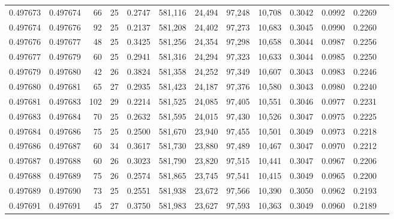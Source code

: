\begin{tabular}{rrrrrrrrrrrrr}
0.497673 & 0.497674 &  66 &  25 &                                     0.2747 & 581,116 &  24,494 &  97,248 &  10,708 & 0.3042 & 0.0992 & 0.2269 \\
0.497674 & 0.497676 &  92 &  25 &                                     0.2137 & 581,208 &  24,402 &  97,273 &  10,683 & 0.3045 & 0.0990 & 0.2260 \\
0.497676 & 0.497677 &  48 &  25 &                                     0.3425 & 581,256 &  24,354 &  97,298 &  10,658 & 0.3044 & 0.0987 & 0.2256 \\
0.497677 & 0.497679 &  60 &  25 &                                     0.2941 & 581,316 &  24,294 &  97,323 &  10,633 & 0.3044 & 0.0985 & 0.2250 \\
0.497679 & 0.497680 &  42 &  26 &                                     0.3824 & 581,358 &  24,252 &  97,349 &  10,607 & 0.3043 & 0.0983 & 0.2246 \\
0.497680 & 0.497681 &  65 &  27 &                                     0.2935 & 581,423 &  24,187 &  97,376 &  10,580 & 0.3043 & 0.0980 & 0.2240 \\
0.497681 & 0.497683 & 102 &  29 &                                     0.2214 & 581,525 &  24,085 &  97,405 &  10,551 & 0.3046 & 0.0977 & 0.2231 \\
0.497683 & 0.497684 &  70 &  25 &                                     0.2632 & 581,595 &  24,015 &  97,430 &  10,526 & 0.3047 & 0.0975 & 0.2225 \\
0.497684 & 0.497686 &  75 &  25 &                                     0.2500 & 581,670 &  23,940 &  97,455 &  10,501 & 0.3049 & 0.0973 & 0.2218 \\
0.497686 & 0.497687 &  60 &  34 &                                     0.3617 & 581,730 &  23,880 &  97,489 &  10,467 & 0.3047 & 0.0970 & 0.2212 \\
0.497687 & 0.497688 &  60 &  26 &                                     0.3023 & 581,790 &  23,820 &  97,515 &  10,441 & 0.3047 & 0.0967 & 0.2206 \\
0.497688 & 0.497689 &  75 &  26 &                                     0.2574 & 581,865 &  23,745 &  97,541 &  10,415 & 0.3049 & 0.0965 & 0.2200 \\
0.497689 & 0.497690 &  73 &  25 &                                     0.2551 & 581,938 &  23,672 &  97,566 &  10,390 & 0.3050 & 0.0962 & 0.2193 \\
0.497691 & 0.497691 &  45 &  27 &                                     0.3750 & 581,983 &  23,627 &  97,593 &  10,363 & 0.3049 & 0.0960 & 0.2189 \\

\end{tabular}
